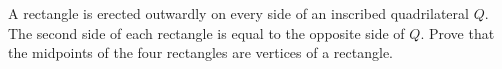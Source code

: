 A rectangle is erected outwardly on every side of an inscribed quadrilateral $Q$. The second side of each rectangle is equal to the opposite side of $Q$. Prove that the midpoints of the four rectangles are vertices of a rectangle.
